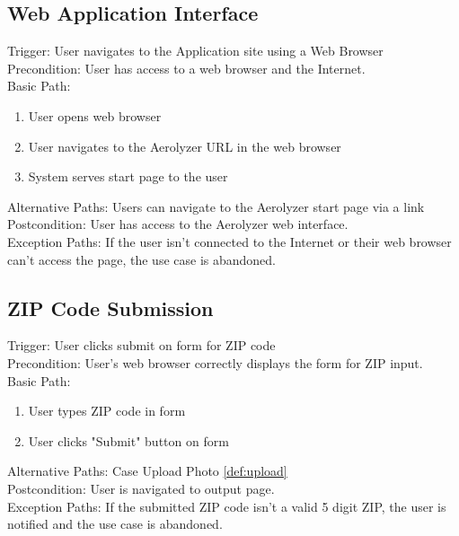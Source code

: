 \documentclass[journal,10pt,draftclsnofoot,onecolumn]{IEEEtran}
\begin{document}
\begin{singlespace}
	\subsection{Web Application Interface} \label{def:webInt}
		Trigger: User navigates to the Application site using a Web Browser\\
		Precondition: User has access to a web browser and the Internet.\\
		Basic Path:
		\begin{enumerate}
			\item User opens web browser
			\item User navigates to the Aerolyzer URL in the web browser
			\item System serves start page to the user
		\end{enumerate}
		Alternative Paths: Users can navigate to the Aerolyzer start page via a link\\
		Postcondition: User has access to the Aerolyzer web interface.\\
		Exception Paths: If the user isn't connected to the Internet or their web browser can't access the page, the use case is abandoned.
	
	\subsection{ZIP Code Submission} \label{def:zip}
		Trigger: User clicks submit on form for ZIP code\\
		Precondition: User's web browser correctly displays the form for ZIP input.\\
		Basic Path:
		\begin{enumerate}
			\item User types ZIP code in form
			\item User clicks "Submit" button on form
		\end{enumerate}
		Alternative Paths: Case Upload Photo \ref{def:upload}\\
		Postcondition: User is navigated to output page.\\
		Exception Paths: If the submitted ZIP code isn't a valid 5 digit ZIP, the user is notified and the use case is abandoned.
	

\end{singlespace}
\end{document}

